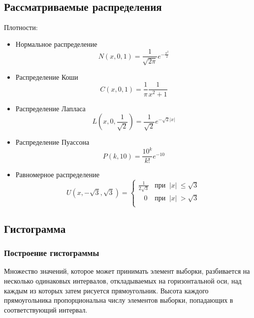 \documentclass[a4paper,12pt]{article} %
\begin{document}
\subsection{Рассматриваемые распределения}
Плотности:
\begin{itemize}
    \item Нормальное распределение
    \begin{equation}\label{norm}
        N(x,0,1)=\frac{1}{\sqrt{2\pi}}e^{-\frac{x^2}{2}}
    \end{equation}
    \item Распределение Коши
    \begin{equation}\label{cauchy}
        C(x, 0, 1)=\frac{1}{\pi}\frac{1}{x^2+1}
    \end{equation}
    \item Распределение Лапласа
    \begin{equation}\label{laplace}
        L(x,0,\frac{1}{\sqrt{2}})=\frac{1}{\sqrt{2}}e^{-\sqrt{2}|x|}
    \end{equation}
    \item Распределение Пуассона
    \begin{equation}\label{poisson}
        P(k, 10)=\frac{10^k}{k!}e^{-10}
    \end{equation}
    \item Равномерное распределение
    \begin{equation}\label{uniform}
        U(x,-\sqrt{3},\sqrt{3})=
        \begin{cases}
        \displaystyle\frac{1}{2\sqrt{3}}&\text{при}\;\;|x|\:\leq\sqrt{3}\\
        \;\;\;0&\text{при}\;\;|x|\:>\sqrt{3}\\
        \end{cases}
    \end{equation}
\end{itemize}
\subsection{Гистограмма}
\subsubsection{Построение гистограммы}
Множество значений, которое может принимать элемент выборки, разбивается на несколько одинаковых интервалов, откладываемых на горизонтальной оси, над каждым из которых затем рисуется прямоугольник. Высота каждого прямоугольника пропорциональна числу элементов выборки, попадающих в соответствующий интервал. 
\end{document}
